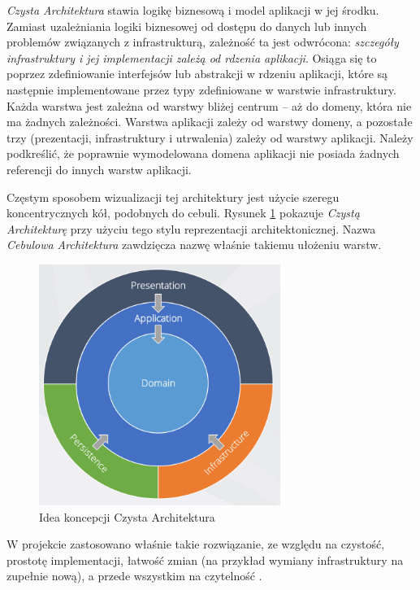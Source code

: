 \documentclass[12pt]{article}
\numberwithin{figure}{section}
\begin{document}
\begin{sloppypar}
\textit{Czysta Architektura} stawia logikę biznesową i model aplikacji w jej środku. Zamiast uzależniania logiki biznesowej od dostępu do danych lub innych problemów związanych z infrastrukturą, zależność ta jest odwrócona: \textit{szczegóły infrastruktury i jej implementacji zależą od rdzenia aplikacji}. Osiąga się to poprzez zdefiniowanie interfejsów lub abstrakcji w rdzeniu aplikacji, które są następnie implementowane przez typy zdefiniowane w warstwie infrastruktury. Każda warstwa jest zależna od warstwy bliżej centrum -- aż do domeny, która nie ma żadnych zależności. Warstwa aplikacji zależy od warstwy domeny, a pozostałe trzy (prezentacji, infrastruktury i utrwalenia) zależy od warstwy aplikacji. Należy podkreślić, że poprawnie wymodelowana domena aplikacji nie posiada żadnych referencji do innych warstw aplikacji.
    
Częstym sposobem wizualizacji tej architektury jest użycie szeregu koncentrycznych kół, podobnych do cebuli. Rysunek \ref{fig:clean-architecture} pokazuje \textit{Czystą Architekturę} przy użyciu tego stylu reprezentacji architektonicznej. Nazwa \textit{Cebulowa Architektura} zawdzięcza nazwę właśnie takiemu ułożeniu warstw.
    
\begin{figure}[H] 
    \centering
    \includegraphics[width=0.7\textwidth]{images/chapter_3/clean-architecture.png}
    \caption{Idea koncepcji Czysta Architektura \cite{clean-architecture}}
    \label{fig:clean-architecture}
\end{figure}
    
W projekcie zastosowano właśnie takie rozwiązanie, ze względu na czystość, prostotę implementacji, łatwość zmian (na przykład wymiany infrastruktury na zupełnie nową), a przede wszystkim na czytelność \cite{clean-architecture}. 


\end{sloppypar}
\end{document}
